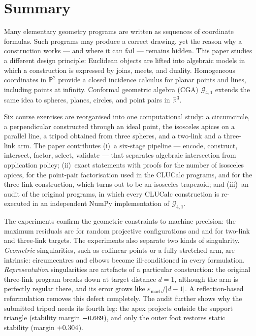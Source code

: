 \documentclass[11pt,a4paper]{article}
\theoremstyle{plain}
\theoremstyle{definition}
\theoremstyle{remark}
\newcommand{\R}{\mathbb{R}}
\newcommand{\PP}{\mathbb{P}}
\newcommand{\GA}{\mathcal{G}_{4,1}}
\newcommand{\abs}[1]{\left\lvert#1\right\rvert}
\begin{document}
\clearpage
\section*{Summary}

Many elementary geometry programs are written as sequences of coordinate
formulas. Such programs may produce a correct drawing, yet the reason why a
construction works --- and where it can fail --- remains hidden. This paper
studies a different design principle: Euclidean objects are lifted into
algebraic models in which a construction is expressed by joins, meets, and
duality. Homogeneous coordinates in $\PP^2$ provide a closed incidence calculus
for planar points and lines, including points at infinity. Conformal geometric
algebra (CGA) $\GA$ extends the same idea to spheres, planes, circles, and
point pairs in $\R^3$.

Six course exercises are reorganised into one computational study: a
circumcircle, a perpendicular constructed through an ideal point, the
isosceles apices on a parallel line, a tripod obtained from three spheres, and
a two-link and a three-link arm. The paper contributes
(i)~a six-stage pipeline --- encode, construct, intersect, factor, select,
validate --- that separates algebraic intersection from application policy;
(ii)~exact statements with proofs for the number of isosceles apices, for the
point-pair factorisation used in the CLUCalc programs, and for the three-link
construction, which turns out to be an isosceles trapezoid; and
(iii)~an audit of the original programs, in which every CLUCalc construction is
re-executed in an independent NumPy implementation of $\GA$.

The experiments confirm the geometric constraints to machine precision: the
maximum residuals are \ProjectiveMaximum{} for \ProjectiveTrials{} random
projective configurations and \TwoLinkMaximum{} and \ThreeLinkMaximum{} for
\TwoLinkTrials{} two-link and \ThreeLinkTrials{} three-link targets. The
experiments also separate two kinds of singularity. \emph{Geometric}
singularities, such as collinear points or a fully stretched arm, are
intrinsic: circumcentres and elbows become ill-conditioned in every
formulation. \emph{Representation} singularities are artefacts of a particular
construction: the original three-link program breaks down at target distance
$d=1$, although the arm is perfectly regular there, and its error grows like
$\varepsilon_{\mathrm{mach}}/\abs{d-1}$. A reflection-based reformulation removes
this defect completely. The audit further shows why the submitted tripod needs
its fourth leg: the apex projects outside the support triangle (stability
margin $-0.669$), and only the outer foot restores static stability
(margin $+0.304$).
\end{document}
